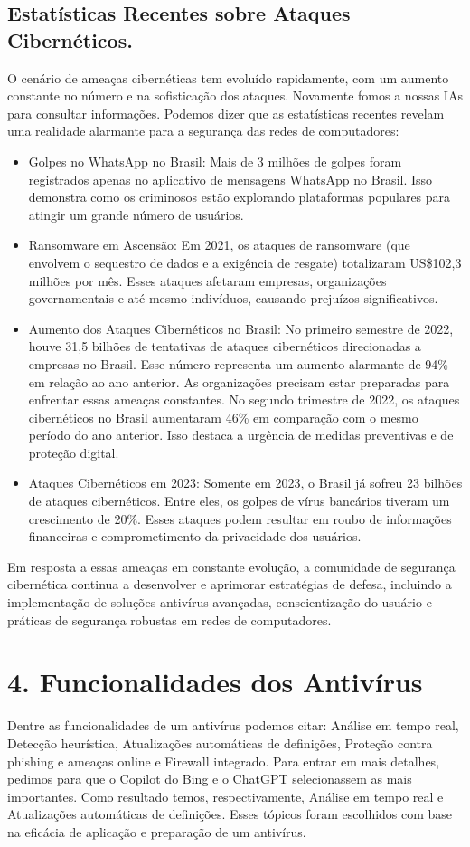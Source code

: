 \documentclass[10pt,conference,twocolumn]{article}
\begin{document}
\subsection*{ Estatísticas Recentes sobre Ataques Cibernéticos.}
O cenário de ameaças cibernéticas tem evoluído rapidamente, com um aumento constante no número e na sofisticação dos ataques. Novamente fomos a nossas IAs para consultar informações. Podemos dizer que as estatísticas recentes revelam uma realidade alarmante para a segurança das redes de computadores:
\begin{itemize}
\item
Golpes no WhatsApp no Brasil:
Mais de 3 milhões de golpes foram registrados apenas no aplicativo de mensagens WhatsApp no Brasil. Isso demonstra como os criminosos estão explorando plataformas populares para atingir um grande número de usuários.
\item 
Ransomware em Ascensão:
Em 2021, os ataques de ransomware (que envolvem o sequestro de dados e a exigência de resgate) totalizaram US\$102,3 milhões por mês. Esses ataques afetaram empresas, organizações governamentais e até mesmo indivíduos, causando prejuízos significativos.
\item 
Aumento dos Ataques Cibernéticos no Brasil:
No primeiro semestre de 2022, houve 31,5 bilhões de tentativas de ataques cibernéticos direcionadas a empresas no Brasil. Esse número representa um aumento alarmante de 94\% em relação ao ano anterior. As organizações precisam estar preparadas para enfrentar essas ameaças constantes.
No segundo trimestre de 2022, os ataques cibernéticos no Brasil aumentaram 46\% em comparação com o mesmo período do ano anterior. Isso destaca a urgência de medidas preventivas e de proteção digital.
\item 
Ataques Cibernéticos em 2023:
Somente em 2023, o Brasil já sofreu 23 bilhões de ataques cibernéticos. Entre eles, os golpes de vírus bancários tiveram um crescimento de 20\%. Esses ataques podem resultar em roubo de informações financeiras e comprometimento da privacidade dos usuários.
\end{itemize}

Em resposta a essas ameaças em constante evolução, a comunidade de segurança cibernética continua a desenvolver e aprimorar estratégias de defesa, incluindo a implementação de soluções antivírus avançadas, conscientização do usuário e práticas de segurança robustas em redes de computadores.

\section* {4. Funcionalidades dos Antivírus}
Dentre as funcionalidades de um antivírus podemos citar: Análise em tempo real, Detecção heurística, Atualizações automáticas de definições, Proteção contra phishing e ameaças online e Firewall integrado. Para entrar em mais detalhes, pedimos para que o Copilot do Bing e o ChatGPT selecionassem as mais importantes. Como resultado temos, respectivamente, Análise em tempo real e Atualizações automáticas de definições. Esses tópicos foram escolhidos com base na eficácia de aplicação e preparação de um antivírus.
\end{document}
